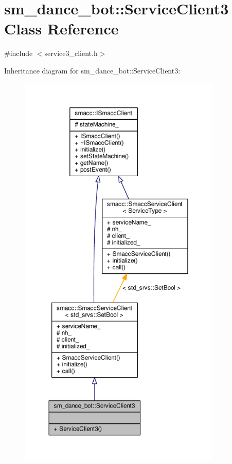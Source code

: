 \hypertarget{classsm__dance__bot_1_1ServiceClient3}{}\section{sm\+\_\+dance\+\_\+bot\+:\+:Service\+Client3 Class Reference}
\label{classsm__dance__bot_1_1ServiceClient3}


{\ttfamily \#include $<$service3\+\_\+client.\+h$>$}



Inheritance diagram for sm\+\_\+dance\+\_\+bot\+:\+:Service\+Client3\+:
\nopagebreak
\begin{figure}[H]
\begin{center}
\leavevmode
\includegraphics[height=550pt]{classsm__dance__bot_1_1ServiceClient3__inherit__graph}
\end{center}
\end{figure}


